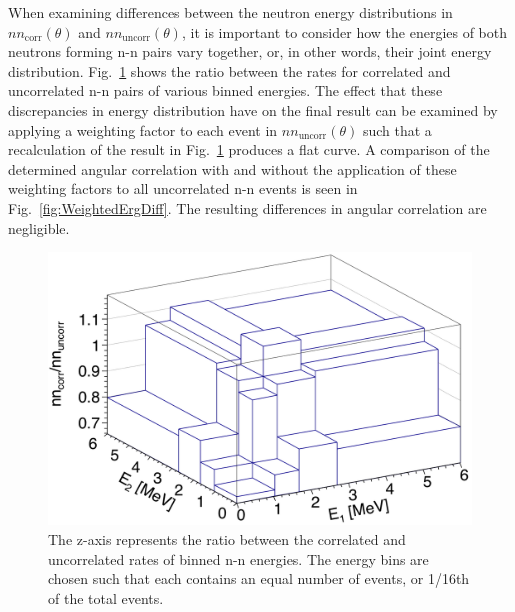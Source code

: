 When examining differences between the neutron energy distributions in $nn_{\text{corr}}(\theta)$ and $nn_{\text{uncorr}}(\theta)$, it is important to consider how the energies of both neutrons forming n-n pairs vary together, or, in other words, their joint energy distribution.
Fig.~\ref{fig:ErgDiffLego} shows the ratio between the rates for correlated and uncorrelated n-n pairs of various binned energies.
The effect that these discrepancies in energy distribution have on the final result can be examined by applying a weighting factor to each event in $nn_{\text{uncorr}}(\theta)$ such that a recalculation of the result in Fig.~\ref{fig:ErgDiffLego} produces a flat curve.
A comparison of the determined angular correlation with and without the application of these weighting factors to all uncorrelated n-n events is seen in Fig.~\ref{fig:WeightedErgDiff}.
The resulting differences in angular correlation are negligible.
\begin{figure}[]
\centering
    \includegraphics[width=\figsize\textwidth]{ErgDiffLego.png}
    \caption{
    The z-axis represents the ratio between the correlated and uncorrelated rates of binned n-n energies.
    The energy bins are chosen such that each contains an equal number of events, or 1/16th of the total events.
    }
    \label{fig:ErgDiffLego}
\end{figure}
